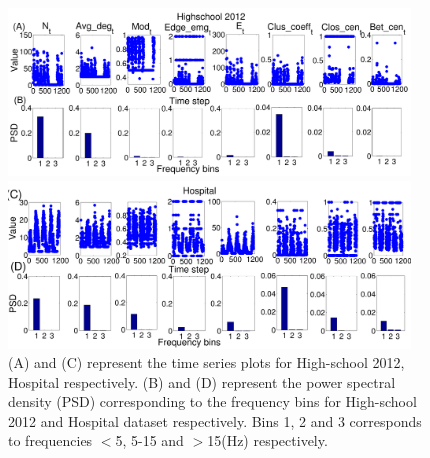   \begin{figure}[!ht]
  
    \centering
  \includegraphics*[width=0.95\textwidth,angle=0]{./texfiles/Chapter_1/fig/highschool_psd-eps-converted-to.pdf}
  
  \centering
  \includegraphics*[width=0.95\textwidth,angle=0]{./texfiles/Chapter_1/fig/hospital_psd-eps-converted-to.pdf}
  
  \caption{\label{fig_all_dataset_1} (A) and (C) represent the time series plots for High-school 2012, Hospital respectively. (B) and (D) represent the power spectral density (PSD) corresponding to the frequency bins for High-school 2012 and Hospital dataset respectively. Bins 1, 2 and 3 corresponds to frequencies $<$5, 5-15 and $>$15(Hz) respectively.}
  
  \end{figure}
% 
%  
